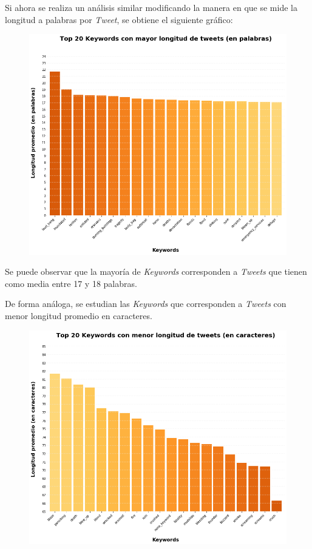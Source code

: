 \documentclass[titlepage,a4paper]{article}
\begin{document}
    Si ahora se realiza un análisis similar modificando la manera en que se mide la longitud a palabras por \textit{Tweet}, se obtiene el siguiente gráfico:
    
    \begin{figure}[H]
    \centering
    \includegraphics[width=1\textwidth]{graficos/Analisis de Keyword/top_20_keywords_con_mayor_long_de_tweets_en_palabras.png}
    \caption{} 
    \end{figure}
     
    Se puede observar que la mayoría de \textit{Keywords} corresponden a \textit{Tweets} que tienen como media entre 17 y 18 palabras.
    
    De forma análoga, se estudian las \textit{Keywords} que corresponden a \textit{Tweets} con menor longitud promedio en caracteres. 
    
    \begin{figure}[H]
    \centering
    \includegraphics[width=1\textwidth]{graficos/Analisis de Keyword/top_20_keywords_con_menor_long_de_tweets_en_caracteres.png}
    \caption{} 
    \end{figure}
    
\end{document}

